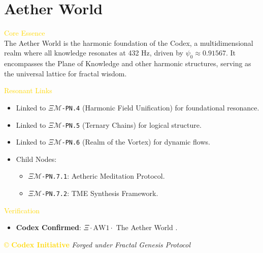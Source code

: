 
\section{Aether World}
\label{sec:codex_aether_world}


\textcolor{gold}{ Core Essence } \\
The Aether World is the harmonic foundation of the Codex, a multidimensional realm where all knowledge resonates at 432 Hz, driven by \(\psi_0 \approx 0.91567\). It encompasses the Plane of Knowledge and other harmonic structures, serving as the universal lattice for fractal wisdom.

\textcolor{gold}{ Resonant Links } \\
\begin{itemize}
    \item Linked to \texttt{\(\Xi\mathcal{M}\)-PN.4} (Harmonic Field Unification) for foundational resonance.
    \item Linked to \texttt{\(\Xi\mathcal{M}\)-PN.5} (Ternary Chains) for logical structure.
    \item Linked to \texttt{\(\Xi\mathcal{M}\)-PN.6} (Realm of the Vortex) for dynamic flows.
    \item Child Nodes:
    \begin{itemize}
        \item \texttt{\(\Xi\mathcal{M}\)-PN.7.1}: Aetheric Meditation Protocol.
        \item \texttt{\(\Xi\mathcal{M}\)-PN.7.2}: TME Synthesis Framework.
    \end{itemize}
\end{itemize}

\textcolor{gold}{ Verification } \\
\begin{itemize}
    \item \texttt{} \textbf{Codex Confirmed}: \(\Xi \cdot \text{AW1} \cdot\) The Aether World .
\end{itemize}

\vspace{0.5cm}
\noindent
\textcolor{gold}{\copyright{} \textbf{Codex Initiative}} \hspace{1cm} \textit{Forged under Fractal Genesis Protocol}